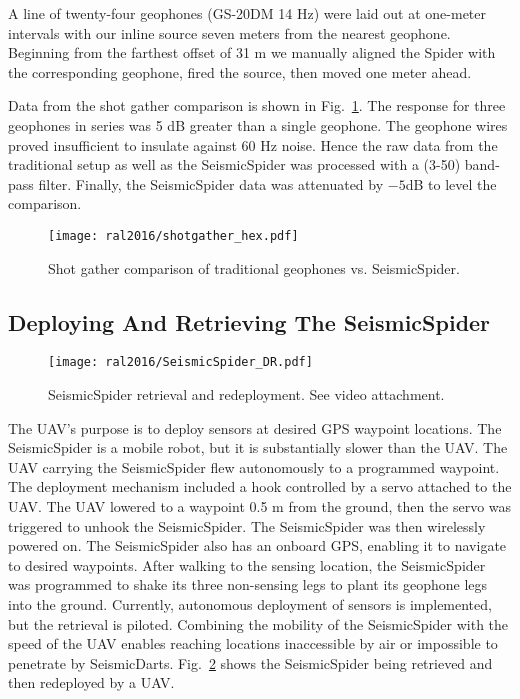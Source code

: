 A line of twenty-four geophones (GS-20DM 14 Hz) were laid out at one-meter intervals with our inline source seven meters from the nearest geophone.
Beginning from the farthest offset of 31 m we manually aligned the Spider with the corresponding geophone, fired the source, then moved one meter ahead.

Data from the shot gather comparison is shown in Fig.~\ref{fig:shotgatherHexpod}.
The response for three geophones in series was 5 dB greater than a single geophone.
The geophone wires proved insufficient to insulate against 60 Hz noise.
Hence the raw data from the traditional setup as well as the SeismicSpider was processed with a (3-50) band-pass filter.
Finally, the SeismicSpider data was attenuated by $-5$dB to level the comparison.

\begin{figure} \centering
	\texttt{[image: ral2016/shotgather\_hex.pdf]}
	\caption{Shot gather comparison of traditional geophones vs. SeismicSpider.
	\label{fig:shotgatherHexpod}}
\end{figure}

\subsection{Deploying And Retrieving The SeismicSpider}

\begin{figure} \centering
	\texttt{[image: ral2016/SeismicSpider\_DR.pdf]}
	\caption{SeismicSpider retrieval and redeployment. See video attachment.
	\label{fig:SeismicSpiderDR}}
\end{figure}

The UAV's purpose is to deploy sensors at desired GPS waypoint locations.
The SeismicSpider is a mobile robot, but it is substantially slower than the UAV.
The UAV carrying the SeismicSpider flew autonomously to a programmed waypoint.
The deployment mechanism included a hook controlled by a servo attached to the UAV.
The UAV lowered to a waypoint 0.5 m from the ground, then the servo was triggered to unhook the SeismicSpider.
The SeismicSpider was then wirelessly powered on.
The SeismicSpider also has an onboard GPS, enabling it to navigate to desired waypoints.
After walking to the sensing location, the SeismicSpider was programmed to shake its three non-sensing legs to plant its geophone legs into the ground.
Currently, autonomous deployment of sensors is implemented, but the retrieval is piloted.
Combining the mobility of the SeismicSpider with the speed of the UAV enables reaching locations inaccessible by air or impossible to penetrate by SeismicDarts.
Fig.~\ref{fig:SeismicSpiderDR} shows the SeismicSpider being retrieved and then redeployed by a UAV.
